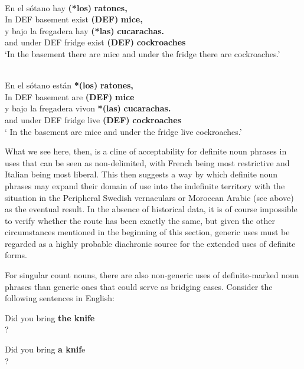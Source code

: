 \z

\ea \label{} 
\\
\gll En  el  sótano  hay  \textbf{(*los)} \textbf{  ratones,}\\
In  DEF  basement  exist  \textbf{(DEF)} \textbf{mice,}\\
\gll y  bajo  la  fregadera  hay  \textbf{(*las)} \textbf{cucarachas.}\\
and  under  DEF  fridge  exist  \textbf{(DEF)} \textbf{cockroaches}\\
\glt ‘In the basement there are mice and under the fridge there are cockroaches.’  

\z

\ea \label{} 
\\
\gll En  el  sótano  están  \textbf{*(los)} \textbf{  ratones,}\\
In  DEF  basement  are  \textbf{(DEF)} \textbf{mice}\\
\gll y  bajo  la  fregadera  vivon  \textbf{*(las)} \textbf{cucarachas.}\\
and  under  DEF  fridge  live  \textbf{(DEF)} \textbf{cockroaches}\\
\glt ‘ In the basement are mice and under the fridge live cockroaches.’  

\z

What we see here, then, is a cline of acceptability for definite noun phrases in uses that can be seen as non-delimited, with French being most restrictive and Italian being most liberal. This then suggests a way by which definite noun phrases may expand their domain of use into the indefinite territory with the situation in the Peripheral Swedish vernaculars or Moroccan Arabic (see  above) as the eventual result. In the absence of historical data, it is of course impossible to verify whether the route has been exactly the same, but given the other circumstances mentioned in the beginning of this section, generic uses must be regarded as a highly probable diachronic source for the extended uses of definite forms. 

For singular count nouns, there are also non-generic uses of definite-marked noun phrases than generic ones that could serve as bridging cases. Consider the following sentences in English:

\ea
\gl \label{bkm:Ref123724733}Did you bring \textbf{the knife}\\?
\z 

\ea 
\gl \label{bkm:Ref123724734}Did you bring \textbf{a knif}e\\?
\z 

